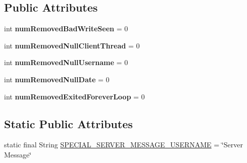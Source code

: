 \subsection*{Public Attributes}
\begin{DoxyCompactItemize}
\item 
\hypertarget{classgov_1_1fnal_1_1ppd_1_1dd_1_1chat_1_1MessagingServer_ae9c73322e842357c87634a60426e5bf0}{int {\bfseries num\-Removed\-Bad\-Write\-Seen} = 0}\label{classgov_1_1fnal_1_1ppd_1_1dd_1_1chat_1_1MessagingServer_ae9c73322e842357c87634a60426e5bf0}

\item 
\hypertarget{classgov_1_1fnal_1_1ppd_1_1dd_1_1chat_1_1MessagingServer_a3fe04e43605b1c81c063cf9d334fb763}{int {\bfseries num\-Removed\-Null\-Client\-Thread} = 0}\label{classgov_1_1fnal_1_1ppd_1_1dd_1_1chat_1_1MessagingServer_a3fe04e43605b1c81c063cf9d334fb763}

\item 
\hypertarget{classgov_1_1fnal_1_1ppd_1_1dd_1_1chat_1_1MessagingServer_a84d7bc143f1eee20c7e39ce9024783c9}{int {\bfseries num\-Removed\-Null\-Username} = 0}\label{classgov_1_1fnal_1_1ppd_1_1dd_1_1chat_1_1MessagingServer_a84d7bc143f1eee20c7e39ce9024783c9}

\item 
\hypertarget{classgov_1_1fnal_1_1ppd_1_1dd_1_1chat_1_1MessagingServer_ab986fa29bcdc51bd186ad23e1c699426}{int {\bfseries num\-Removed\-Null\-Date} = 0}\label{classgov_1_1fnal_1_1ppd_1_1dd_1_1chat_1_1MessagingServer_ab986fa29bcdc51bd186ad23e1c699426}

\item 
\hypertarget{classgov_1_1fnal_1_1ppd_1_1dd_1_1chat_1_1MessagingServer_a189ff6081d21eb1a9c98887d84e23b17}{int {\bfseries num\-Removed\-Exited\-Forever\-Loop} = 0}\label{classgov_1_1fnal_1_1ppd_1_1dd_1_1chat_1_1MessagingServer_a189ff6081d21eb1a9c98887d84e23b17}

\end{DoxyCompactItemize}
\subsection*{Static Public Attributes}
\begin{DoxyCompactItemize}
\item 
static final String \hyperlink{classgov_1_1fnal_1_1ppd_1_1dd_1_1chat_1_1MessagingServer_a738da0a18944421491268d2220a3c7a4}{S\-P\-E\-C\-I\-A\-L\-\_\-\-S\-E\-R\-V\-E\-R\-\_\-\-M\-E\-S\-S\-A\-G\-E\-\_\-\-U\-S\-E\-R\-N\-A\-M\-E} = \char`\"{}Server Message\char`\"{}
\end{DoxyCompactItemize}
